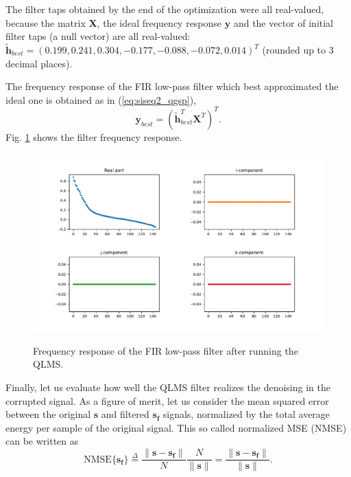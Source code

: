 The filter taps obtained by the end of the optimization were all real-valued, because the matrix $\mathbf{X}$, the ideal frequency response $\mathbf{y}$ and the vector of initial filter taps (a null vector) are all real-valued: $\mathbf{\widetilde{h}}_{best} = (
    0.199, 0.241, 0.304, -0.177, -0.088, -0.072, 0.014
    )^T$ (rounded up to 3 decimal places).

The frequency response of the FIR low-pass filter which best approximated the ideal one is obtained as in (\ref{eq:siseq2_qgsp}),
\begin{equation}
    \mathbf{y}_{best} = \left(
    \mathbf{\widetilde{h}}_{best}^T \mathbf{X}^T
    \right)^T.
\end{equation}
Fig. \ref{fig:uk_qlm_filter} shows the filter frequency response.

\begin{figure}
    \centering
    \caption{Frequency response of the FIR low-pass filter after running the QLMS.}
    \includegraphics[width=\linewidth]{Figures/uk_example/uk_qlm_filter.pdf}
    \floatsource
    \label{fig:uk_qlm_filter}
\end{figure}

Finally, let us evaluate how well the QLMS filter realizes the denoising in the corrupted signal. As a figure of merit, let us consider the mean squared error between the original $\mathbf{s}$ and filtered $\mathbf{s_f}$ signals, normalized by the total average energy per sample of the original signal. This so called normalized MSE (NMSE) can be written as
\begin{equation}
    \label{eq:errormetric}
    \text{NMSE}\{ \mathbf{s_f} \} \overset{\Delta}{=}
    \frac{\parallel \mathbf{s} - \mathbf{s_f} \parallel}{N}
    \frac{N}{{\parallel \mathbf{s} \parallel}}
    =
    \frac{\parallel \mathbf{s} - \mathbf{s_f} \parallel}{\parallel \mathbf{s} \parallel}.
\end{equation}

